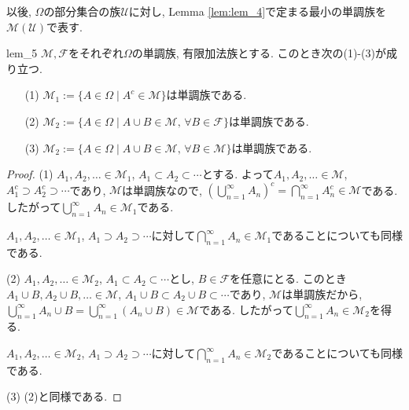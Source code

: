 以後, $\Omega$の部分集合の族$\mathcal{U}$に対し, Lemma \ref{lem:lem_4}で定まる最小の単調族を$\mathcal{M}(\mathcal{U})$で表す.

\begin{lemma}{}{lem_5}
    $\mathcal{M},\mathcal{F}$をそれぞれ$\Omega$の単調族, 有限加法族とする.
    このとき次の(1)-(3)が成り立つ.
    \begin{itemize}
        \item[(1)] $\mathcal{M}_1:=\{A\in\Omega\mid A^c\in\mathcal{M}\}$は単調族である.
        \item[(2)] $\mathcal{M}_2:=\{A\in\Omega\mid A\cup B\in\mathcal{M},\,\forall B\in\mathcal{F}\}$は単調族である.
        \item[(3)] $\mathcal{M}_2:=\{A\in\Omega\mid A\cup B\in\mathcal{M},\,\forall B\in\mathcal{M}\}$は単調族である.
    \end{itemize}
\end{lemma}
\begin{proof}
    (1) $A_1,A_2,\dots\in\mathcal{M}_1$, $A_1\subset A_2\subset\cdots$とする.
    よって$A_1,A_2,\dots\in\mathcal{M}$, $A_1^c\supset A_2^c\supset\cdots$であり, $\mathcal{M}$は単調族なので, $(\bigcup_{n=1}^\infty A_n)^c=\bigcap_{n=1}^\infty A_n^c\in\mathcal{M}$である.
    したがって$\bigcup_{n=1}^\infty A_n\in\mathcal{M}_1$である.

    $A_1,A_2,\dots\in\mathcal{M}_1$, $A_1\supset A_2\supset\cdots$に対して$\bigcap_{n=1}^\infty A_n\in\mathcal{M}_1$であることについても同様である.

    (2) $A_1,A_2,\dots\in\mathcal{M}_2$, $A_1\subset A_2\subset\cdots$とし, $B\in\mathcal{F}$を任意にとる.
    このとき$A_1\cup B,A_2\cup B,\dots\in\mathcal{M}$, $A_1\cup B\subset A_2\cup B\subset\cdots$であり, $\mathcal{M}$は単調族だから, $\bigcup_{n=1}^\infty A_n \cup B=\bigcup_{n=1}^\infty (A_n \cup B)\in\mathcal{M}$である.
    したがって$\bigcup_{n=1}^\infty A_n\in\mathcal{M}_2$を得る.

    $A_1,A_2,\dots\in\mathcal{M}_2$, $A_1\supset A_2\supset\cdots$に対して$\bigcap_{n=1}^\infty A_n\in\mathcal{M}_2$であることについても同様である.

    (3) (2)と同様である.
\end{proof}

